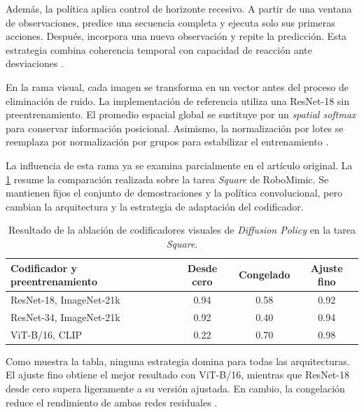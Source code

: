 Adem\'as, la pol\'itica aplica control de horizonte recesivo. A partir de una ventana
de observaciones, predice una secuencia completa y ejecuta solo sus primeras
acciones. Despu\'es, incorpora una nueva observaci\'on y repite la predicci\'on. Esta
estrategia combina coherencia temporal con capacidad de reacci\'on ante desviaciones
\cite{chi2025diffusion}.

En la rama visual, cada imagen se transforma en un vector antes del proceso de
eliminaci\'on de ruido. La implementaci\'on de referencia utiliza una ResNet-18 sin
preentrenamiento. El promedio espacial global se sustituye por un \textit{spatial
softmax} para conservar informaci\'on posicional. Asimismo, la normalizaci\'on por
lotes se reemplaza por normalizaci\'on por grupos para estabilizar el entrenamiento
\cite{chi2025diffusion}.

La influencia de esta rama ya se examina parcialmente en el art\'iculo original. La
\cref{tab:ablation-visual-dp} resume la comparaci\'on realizada sobre la tarea
\textit{Square} de RoboMimic. Se mantienen fijos el conjunto de demostraciones y la
pol\'itica convolucional, pero cambian la arquitectura y la estrategia de adaptaci\'on
del codificador.

\begin{table}[htbp]
  \centering
  \caption{Resultado de la ablaci\'on de codificadores visuales de \textit{Diffusion
  Policy} en la tarea \textit{Square}.}
  \label{tab:ablation-visual-dp}
  \begin{tabular}{lccc}
    \toprule
    Codificador y preentrenamiento & Desde cero & Congelado & Ajuste fino \\
    \midrule
    ResNet-18, ImageNet-21k & \num{0.94} & \num{0.58} & \num{0.92} \\
    ResNet-34, ImageNet-21k & \num{0.92} & \num{0.40} & \num{0.94} \\
    ViT-B/16, CLIP           & \num{0.22} & \num{0.70} & \num{0.98} \\
    \bottomrule
  \end{tabular}
\end{table}

Como muestra la tabla, ninguna estrategia domina para todas las arquitecturas. El
ajuste fino obtiene el mejor resultado con ViT-B/16, mientras que ResNet-18 desde
cero supera ligeramente a su versi\'on ajustada. En cambio, la congelaci\'on reduce el
rendimiento de ambas redes residuales \cite{chi2025diffusion}.

